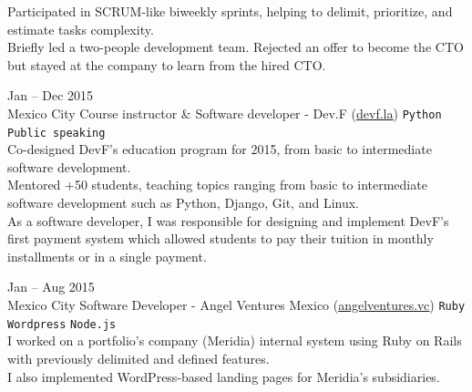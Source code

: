 \documentclass[9pt]{developercv} %
\begin{document}
\begin{entrylist}
{            Participated in SCRUM-like biweekly sprints, helping to delimit, prioritize, and 
            estimate tasks complexity.\\
            
            Briefly led a two-people development team. Rejected an offer to become the CTO but 
            stayed at the company to learn from the hired CTO.
        }

    \entry
        {
            Jan -- Dec 2015
            \\\footnotesize{Mexico City}
        }
        {Course instructor \& Software developer - Dev.F ({\href{https://devf.la/}{\underline{devf.la}}})}
        {
            \texttt{Python}
            \slashsep\texttt{Public speaking}
        }
        {\\
            Co-designed DevF's education program for 2015, from basic to intermediate software development. \\

            Mentored +50 students, teaching topics ranging from basic to intermediate software 
            development such as Python, Django, Git, and Linux. \\
            
            As a software developer, I was responsible for designing and implement DevF's first 
            payment system which allowed students to pay their tuition in monthly installments or 
            in a single payment.\\
        }

    \entry
        {
            Jan -- Aug 2015
            \\\footnotesize{Mexico City}
        }
        {Software Developer - Angel Ventures Mexico ({\href{http://www.angelventures.vc/}{\underline{angelventures.vc}}})}
        {   
            \texttt{Ruby}
            \slashsep\texttt{Wordpress}
            \slashsep\texttt{Node.js}
        }
        {\\
            I worked on a portfolio's company (Meridia) internal system using Ruby on Rails with 
            previously delimited and defined features. \\

            I also implemented WordPress-based landing pages for Meridia's subsidiaries.
        }

\end{entrylist}

\end{document}
